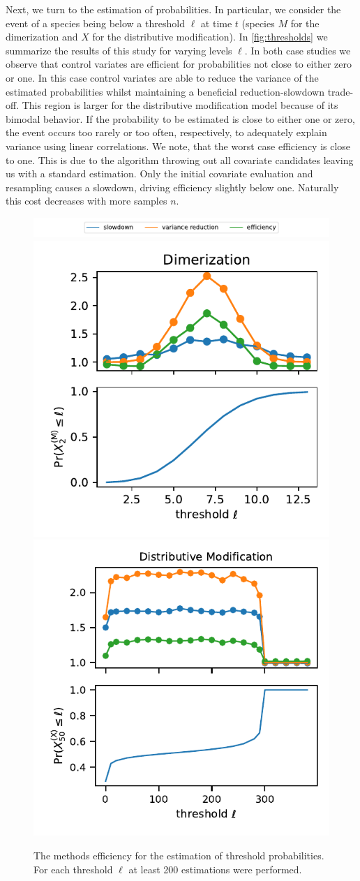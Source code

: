 Next, we turn to the estimation of probabilities.
In particular, we consider the event of a species being below a
threshold $\ell$ at time $t$ (species $M$ for the dimerization and
$X$ for the distributive modification).
In \autoref{fig:thresholds} we summarize the results of this study
for varying levels $\ell$.
In both case studies we observe that control variates are efficient
for probabilities not close to either zero or one.
In this case control variates are able to reduce the variance of the
estimated probabilities whilst maintaining a beneficial
reduction-slowdown trade-off.
This region is larger for the distributive modification model because
of its bimodal behavior.
If the probability to be estimated is close to either one or zero,
the event occurs too rarely or too often, respectively, to adequately
explain variance using linear correlations.
We note, that the worst case efficiency is close to one.
This is due to the algorithm throwing out all covariate candidates
leaving us with a standard estimation.
Only the initial covariate evaluation and resampling causes a
slowdown, driving efficiency slightly below one.
Naturally this cost decreases with more samples $n$.
\begin{figure}[htb]
  \centering
  \includegraphics[scale=0.65]{gfx/legend_thres.pdf}\\
  \includegraphics[width=.49\textwidth]{gfx/dim_thresholds.pdf}
  \includegraphics[width=.49\textwidth]{gfx/dm_threholds.pdf}
  \caption[\ac{CV} for probabililty estimation]{The methods
    efficiency for the estimation of threshold probabilities. For each
  threshold $\ell$ at least 200 estimations were performed.}
  \label{fig:thresholds}
\end{figure}

